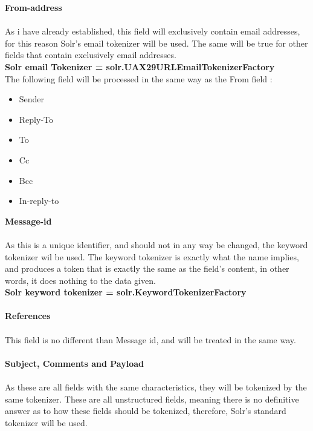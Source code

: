 \documentclass{report}
\begin{document}
\noindent
\textbf{From-address}\\\\
As i have already established, this field will exclusively contain email addresses, for this reason Solr’s email tokenizer will be used. The same will be true for other fields that contain exclusively email addresses.\\

\textbf{Solr email Tokenizer  = solr.UAX29URLEmailTokenizerFactory}\\

\noindent
The following field will be processed in the same way as the From field :

\begin{itemize}
\item Sender 
\item Reply-To
\item To
\item Cc
\item Bcc
\item In-reply-to\\
\end{itemize}

\noindent
\textbf{Message-id} \\\\
As this is a unique identifier, and should not in any way be changed, the keyword tokenizer wil be used. The keyword tokenizer is exactly what the name implies, and produces a token that is exactly the same as the field's content, in other words, it does nothing to the data given.\\

\textbf{Solr keyword tokenizer = solr.KeywordTokenizerFactory}\\\\

\noindent
\textbf{References}\\ \\
This field is no different than Message id, and will be treated in the same way.\\\\

\noindent
\textbf{Subject, Comments and Payload}\\\\
As these are all fields with the same characteristics, they will be tokenized by the same tokenizer. These are all unstructured fields, meaning there is no definitive answer as to how these fields should be tokenized, therefore, Solr’s standard tokenizer will be used.\\
\end{document}
